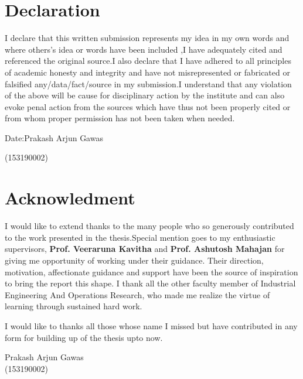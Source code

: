 \documentclass[11pt,a4paper,oneside]{report}
\date{}
\begin{document}

\chapter*{Declaration}
I declare that this written submission represents my idea in my own words and where others's idea or words have been included ,I have adequately cited and referenced the original source.I also declare that I have adhered to all principles of academic honesty and integrity and have not misrepresented or fabricated or falsified any/data/fact/source in my submission.I understand that any violation of the above will be cause for disciplinary action by the institute and can also evoke penal action from the sources which have thus not been properly cited or from whom proper permission has not been taken when needed.
\vspace{1cm}


\noindent Date:\hfill Prakash Arjun Gawas                     
\begin{flushright}(153190002)\end{flushright}
\chapter*{Acknowledment}
I would like to extend thanks to the many people who so generously contributed to the work presented in the thesis.Special mention goes to my enthusiastic supervisors, \textbf{Prof. Veeraruna Kavitha} and \textbf{Prof. Ashutosh Mahajan} for giving me opportunity of working under their guidance. Their direction, motivation, affectionate guidance and support have been the source of inspiration to bring the report this shape. I thank all the other faculty member of Industrial Engineering And Operations Research, who made me realize the virtue of learning through sustained hard work.
\vspace{6mm}

\noindent I would like to thanks all those whose name I missed but have contributed in any form for building up of the thesis upto now.
\vspace{1cm}

\begin{flushright}
Prakash Arjun Gawas\\
(153190002)
\end{flushright}
\end{document}
